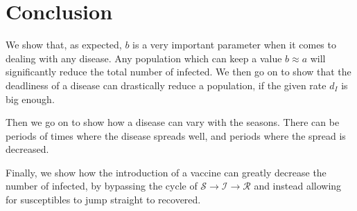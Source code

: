 \documentclass[../main.tex]{subfiles}
\begin{document}
\section{Conclusion}\label{sec:conclusion}

We show that, as expected, $b$ is a very important parameter when it comes to dealing with any disease. Any population which can keep a value $b \approx a$ will significantly reduce the total number of infected. 
We then go on to show that the deadliness of a disease can drastically reduce a population, if the given rate $d_I$ is big enough.

Then we go on to show how a disease can vary with the seasons. There can be periods of times where the disease spreads well, and periods where the spread is decreased.

Finally, we show how the introduction of a vaccine can greatly decrease the number of infected, by bypassing the cycle of $\mathcal{S} \longrightarrow \mathcal{I} \longrightarrow \mathcal{R}$ and instead allowing for susceptibles to jump straight to recovered.
\end{document}

